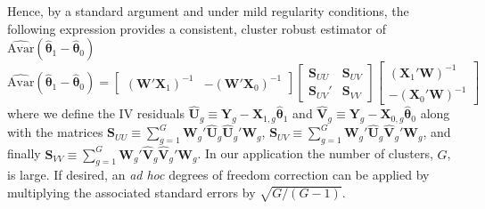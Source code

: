 \begin{appendix}
Hence, by a standard argument and under mild regularity conditions, the following expression provides a consistent, cluster robust estimator of $\widehat{\text{Avar}}(\widehat{\boldsymbol{\theta}}_1 - \widehat{\boldsymbol{\theta}}_0)$ 
\[
\widehat{\text{Avar}}(\widehat{\boldsymbol{\theta}}_1 - \widehat{\boldsymbol{\theta}}_0) 
= \begin{bmatrix}
\left(\mathbf{W}'\mathbf{X}_1\right)^{-1} &
-\left(\mathbf{W}'\mathbf{X}_0\right)^{-1} 
\end{bmatrix}
\begin{bmatrix}
\mathbf{S}_{UU}& \mathbf{S}_{UV}\\
\mathbf{S}_{UV}'& \mathbf{S}_{VV}
\end{bmatrix} 
\begin{bmatrix}
\left(\mathbf{X}_1'\mathbf{W}\right)^{-1} \\
-\left(\mathbf{X}_0'\mathbf{W}\right)^{-1} 
\end{bmatrix}
\]
where we define the IV residuals
$\widehat{\mathbf{U}}_g \equiv \mathbf{Y}_g - \mathbf{X}_{1,g}\widehat{\boldsymbol{\theta}}_1$ and
$\widehat{\mathbf{V}}_g \equiv \mathbf{Y}_g - \mathbf{X}_{0,g}\widehat{\boldsymbol{\theta}}_0$ along with the matrices
$\mathbf{S}_{UU} \equiv \sum_{g=1}^G \mathbf{W}_g' \widehat{\mathbf{U}}_g \widehat{\mathbf{U}}_g' \mathbf{W}_g$,
$\mathbf{S}_{UV} \equiv \sum_{g=1}^G \mathbf{W}_g' \widehat{\mathbf{U}}_g \widehat{\mathbf{V}}_g' \mathbf{W}_g$, and finally
$\mathbf{S}_{VV} \equiv \sum_{g=1}^G \mathbf{W}_g' \widehat{\mathbf{V}}_g \widehat{\mathbf{V}}_g' \mathbf{W}_g$.
In our application the number of clusters, $G$, is large.
If desired, an \emph{ad hoc} degrees of freedom correction can be applied by multiplying the associated standard errors by $\sqrt{G/(G-1)}$.


\end{appendix}
